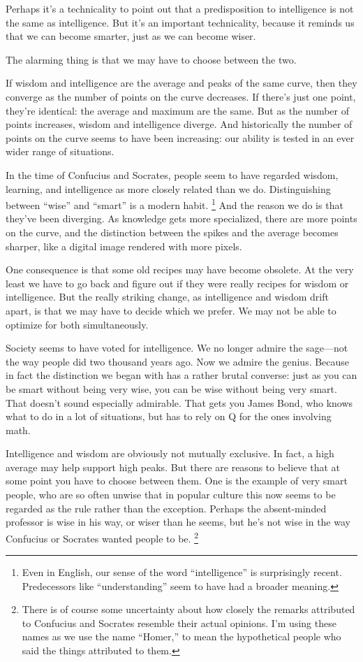 \documentclass[12pt]{book}
\begin{document}
Perhaps it's a technicality to point out that a predisposition to
intelligence is not the same as intelligence. But it's an important
technicality, because it reminds us that we can become smarter, just as
we can become wiser.

The alarming thing is that we may have to choose between the two.

If wisdom and intelligence are the average and peaks of the same curve,
then they converge as the number of points on the curve decreases. If
there's just one point, they're identical: the average and maximum are
the same. But as the number of points increases, wisdom and intelligence
diverge. And historically the number of points on the curve seems to
have been increasing: our ability is tested in an ever wider range of
situations.

In the time of Confucius and Socrates, people seem to have regarded
wisdom, learning, and intelligence as more closely related than we do.
Distinguishing between ``wise'' and ``smart'' is a modern habit.
\footnote{Even in English, our sense of the word ``intelligence'' is
surprisingly recent. Predecessors like ``understanding'' seem to have
had a broader meaning.} And the reason we do is that they've been
diverging. As knowledge gets more specialized, there are more points on
the curve, and the distinction between the spikes and the average
becomes sharper, like a digital image rendered with more pixels.

One consequence is that some old recipes may have become obsolete. At
the very least we have to go back and figure out if they were really
recipes for wisdom or intelligence. But the really striking change, as
intelligence and wisdom drift apart, is that we may have to decide which
we prefer. We may not be able to optimize for both simultaneously.

Society seems to have voted for intelligence. We no longer admire the
sage---not the way people did two thousand years ago. Now we admire the
genius. Because in fact the distinction we began with has a rather
brutal converse: just as you can be smart without being very wise, you
can be wise without being very smart. That doesn't sound especially
admirable. That gets you James Bond, who knows what to do in a lot of
situations, but has to rely on Q for the ones involving math.

Intelligence and wisdom are obviously not mutually exclusive. In fact, a
high average may help support high peaks. But there are reasons to
believe that at some point you have to choose between them. One is the
example of very smart people, who are so often unwise that in popular
culture this now seems to be regarded as the rule rather than the
exception. Perhaps the absent-minded professor is wise in his way, or
wiser than he seems, but he's not wise in the way Confucius or Socrates
wanted people to be. \footnote{There is of course some uncertainty about how closely the
remarks attributed to Confucius and Socrates resemble their actual
opinions. I'm using these names as we use the name ``Homer,'' to mean
the hypothetical people who said the things attributed to them.}
\end{document}
